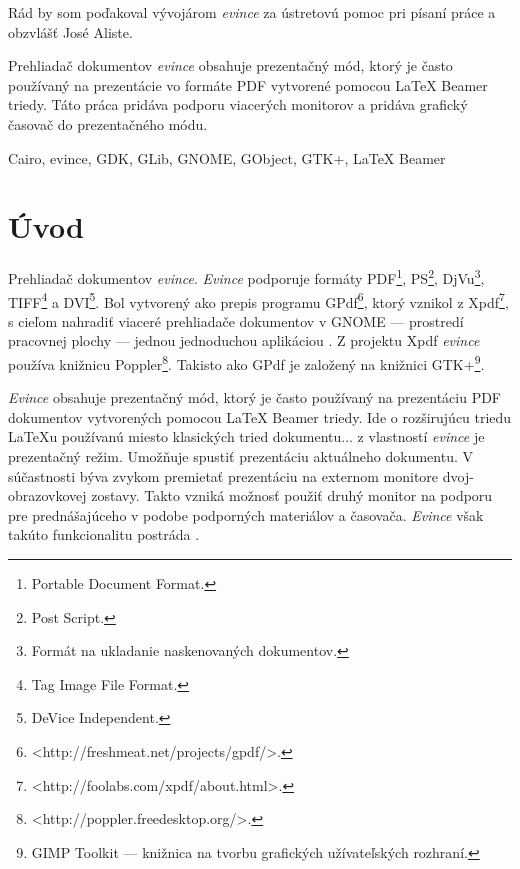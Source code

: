 \documentclass[12pt,oneside,final]{fithesis2}
\begin{document}
\FrontMatter
\ThesisTitlePage

\begin{ThesisDeclaration}
\DeclarationText
\AdvisorName
\end{ThesisDeclaration}

\begin{ThesisThanks}
Rád by som poďakoval vývojárom \emph{evince} za ústretovú pomoc pri písaní práce a obzvlášť José Aliste.
\end{ThesisThanks}  

\begin{ThesisAbstract}
Prehliadač dokumentov \emph{evince} obsahuje prezentačný mód, ktorý je často používaný na prezentácie vo formáte PDF vytvorené pomocou LaTeX Beamer triedy. Táto práca pridáva podporu viacerých monitorov a pridáva grafický časovač do prezentačného módu.
\end{ThesisAbstract}

\begin{ThesisKeyWords}
Cairo, evince, GDK, GLib, GNOME, GObject, GTK+, LaTeX Beamer
\end{ThesisKeyWords}
 
\MainMatter
\setcounter{tocdepth}{3}
\tableofcontents 
 
\chapter{Úvod}
Prehliadač dokumentov \emph{evince}. \emph{Evince} podporuje formáty PDF\footnote{Portable Document Format.}, PS\footnote{Post Script.}, DjVu\footnote{Formát na ukladanie naskenovaných dokumentov.}, TIFF\footnote{Tag Image File Format.} a DVI\footnote{DeVice Independent.}. Bol vytvorený ako prepis programu GPdf\footnote{<http://freshmeat.net/projects/gpdf/>.}, ktorý vznikol z Xpdf\footnote{<http://foolabs.com/xpdf/about.html>.}, s cieľom nahradiť viaceré prehliadače dokumentov v GNOME --- prostredí pracovnej plochy --- jednou jednoduchou aplikáciou \cite{evince}. Z projektu Xpdf \emph{evince} používa knižnicu Poppler\footnote{<http://poppler.freedesktop.org/>.}. Takisto ako GPdf je založený na knižnici GTK+\footnote{GIMP Toolkit --- knižnica na tvorbu grafických užívateľských rozhraní.}.

\emph{Evince} obsahuje prezentačný mód, ktorý je často používaný na prezentáciu PDF dokumentov vytvorených pomocou LaTeX Beamer triedy. Ide o rozširujúcu triedu LaTeXu používanú miesto klasických tried dokumentu... z vlastností \emph{evince} je prezentačný režim. Umožňuje spustiť prezentáciu aktuálneho dokumentu. V súčastnosti býva zvykom premietať prezentáciu na externom monitore dvoj-obrazovkovej zostavy. Takto vzniká možnosť použiť druhý monitor na podporu pre prednášajúceho v podobe podporných materiálov a časovača. \emph{Evince} však takúto funkcionalitu postráda \cite{evbug}.
 
\end{document}
